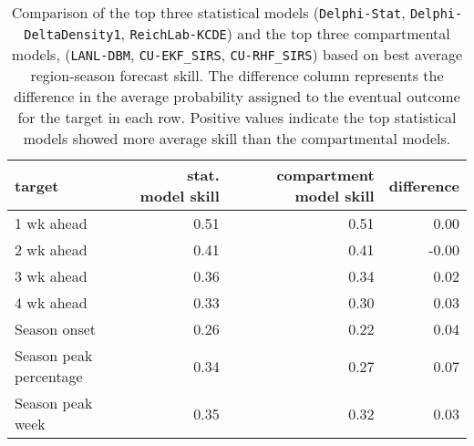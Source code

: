 \begin{table}[ht]
\centering
\begin{tabular}{lrrr}
  \hline
target & stat. model skill & compartment model skill & difference \\ 
  \hline
1 wk ahead & 0.51 & 0.51 & 0.00 \\ 
  2 wk ahead & 0.41 & 0.41 & -0.00 \\ 
  3 wk ahead & 0.36 & 0.34 & 0.02 \\ 
  4 wk ahead & 0.33 & 0.30 & 0.03 \\ 
  Season onset & 0.26 & 0.22 & 0.04 \\ 
  Season peak percentage & 0.34 & 0.27 & 0.07 \\ 
  Season peak week & 0.35 & 0.32 & 0.03 \\ 
   \hline
\end{tabular}
\caption{Comparison of the top three statistical models ({\tt Delphi-Stat}, {\tt Delphi-DeltaDensity1}, {\tt ReichLab-KCDE}) and the top three compartmental models, ({\tt LANL-DBM}, {\tt CU-EKF\_SIRS}, {\tt CU-RHF\_SIRS}) based on best average region-season forecast skill. The difference column represents the difference in the average probability assigned to the eventual outcome for the target in each row. Positive values indicate the top statistical models showed more average skill than the compartmental models.} 
\label{tab:score-by-model-type}
\end{table}
